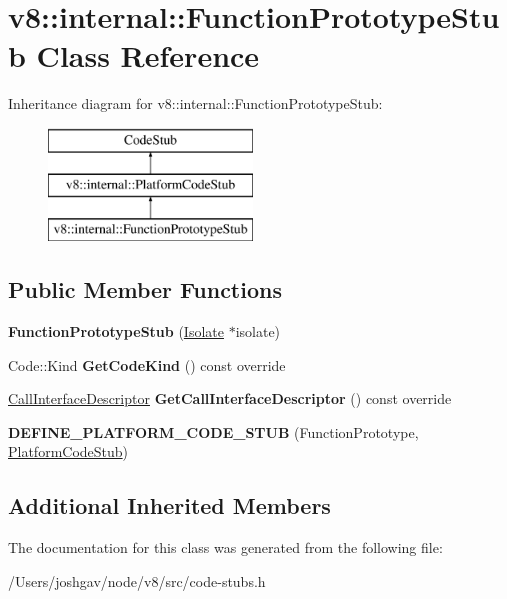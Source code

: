 \hypertarget{classv8_1_1internal_1_1_function_prototype_stub}{}\section{v8\+:\+:internal\+:\+:Function\+Prototype\+Stub Class Reference}
\label{classv8_1_1internal_1_1_function_prototype_stub}
Inheritance diagram for v8\+:\+:internal\+:\+:Function\+Prototype\+Stub\+:\begin{figure}[H]
\begin{center}
\leavevmode
\includegraphics[height=3.000000cm]{classv8_1_1internal_1_1_function_prototype_stub}
\end{center}
\end{figure}
\subsection*{Public Member Functions}
\begin{DoxyCompactItemize}
\item 
{\bfseries Function\+Prototype\+Stub} (\hyperlink{classv8_1_1internal_1_1_isolate}{Isolate} $\ast$isolate)\hypertarget{classv8_1_1internal_1_1_function_prototype_stub_aba2aa90e53a7fee729926fe827451f8b}{}\label{classv8_1_1internal_1_1_function_prototype_stub_aba2aa90e53a7fee729926fe827451f8b}

\item 
Code\+::\+Kind {\bfseries Get\+Code\+Kind} () const  override\hypertarget{classv8_1_1internal_1_1_function_prototype_stub_a5987514ecb9ad737da4d4f31b5110a6e}{}\label{classv8_1_1internal_1_1_function_prototype_stub_a5987514ecb9ad737da4d4f31b5110a6e}

\item 
\hyperlink{classv8_1_1internal_1_1_call_interface_descriptor}{Call\+Interface\+Descriptor} {\bfseries Get\+Call\+Interface\+Descriptor} () const  override\hypertarget{classv8_1_1internal_1_1_function_prototype_stub_afa46ac3fc74690e6a7ac47e09b055c39}{}\label{classv8_1_1internal_1_1_function_prototype_stub_afa46ac3fc74690e6a7ac47e09b055c39}

\item 
{\bfseries D\+E\+F\+I\+N\+E\+\_\+\+P\+L\+A\+T\+F\+O\+R\+M\+\_\+\+C\+O\+D\+E\+\_\+\+S\+T\+UB} (Function\+Prototype, \hyperlink{classv8_1_1internal_1_1_platform_code_stub}{Platform\+Code\+Stub})\hypertarget{classv8_1_1internal_1_1_function_prototype_stub_a3b11d6447762551ed9412bc037985b62}{}\label{classv8_1_1internal_1_1_function_prototype_stub_a3b11d6447762551ed9412bc037985b62}

\end{DoxyCompactItemize}
\subsection*{Additional Inherited Members}


The documentation for this class was generated from the following file\+:\begin{DoxyCompactItemize}
\item 
/\+Users/joshgav/node/v8/src/code-\/stubs.\+h\end{DoxyCompactItemize}
